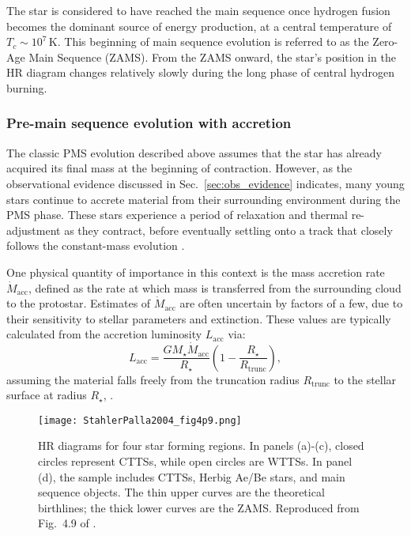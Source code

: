 \documentclass[12pt,a4paper]{article}
\newcommand{\mr}{\mathrm}
\begin{document}
The star is considered to have reached the main sequence once hydrogen fusion becomes the dominant source of energy production, at a central temperature of $T_c \sim 10^7\,\mr{K}$. This beginning of main sequence evolution is referred to as the Zero-Age Main Sequence (ZAMS). From the ZAMS onward, the star's position in the HR diagram changes relatively slowly during the long phase of central hydrogen burning.

\subsubsection{Pre-main sequence evolution with accretion}
\label{sec:pms_accretion}

The classic PMS evolution described above assumes that the star has already acquired its final mass at the beginning of contraction. However, as the observational evidence discussed in Sec.~\ref{sec:obs_evidence} indicates, many young stars continue to accrete material from their surrounding environment during the PMS phase. These stars experience a period of relaxation and thermal re-adjustment as they contract, before eventually settling onto a track that closely follows the constant-mass evolution \parencite{KippenhahnEtAl2013}.

One physical quantity of importance in this context is the mass accretion rate $\dot{M}_\mr{acc}$, defined as the rate at which mass is transferred from the surrounding cloud to the protostar. Estimates of $\dot{M}_\mr{acc}$ are often uncertain by factors of a few, due to their sensitivity to stellar parameters and extinction. These values are typically calculated from the accretion luminosity $L_\mr{acc}$ via:
\begin{equation}
  L_\mr{acc} = \frac{GM_\star \dot{M}_\mr{acc}}{R_\star}\left(1 - \frac{R_\star}{R_\mr{trunc}}\right),
\end{equation}
assuming the material falls freely from the truncation radius $R_\mr{trunc}$ to the stellar surface at radius $R_\star$, \parencite[see review by][]{HartmannEtAl2016}. 

\begin{figure}[htbp]
  \centering
  \texttt{[image: StahlerPalla2004\_fig4p9.png]}
  \caption{HR diagrams for four star forming regions. In panels (a)-(c), closed circles represent CTTSs, while open circles are WTTSs. In panel (d), the sample includes CTTSs, Herbig Ae/Be stars, and main sequence objects. The thin upper curves are the theoretical birthlines; the thick lower curves are the ZAMS. Reproduced from Fig.~4.9 of \textcite{StahlerPalla2004}.} \label{fig:obs_birthline} 
\end{figure}
\end{document}
